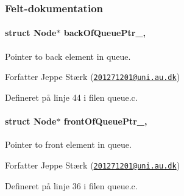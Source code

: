 \subsubsection{Felt-\/dokumentation}
\paragraph[{\texorpdfstring{back\+Of\+Queue\+Ptr\+\_\+}{backOfQueuePtr_}}]{\setlength{\rightskip}{0pt plus 5cm}struct {\bf Node}$\ast$ back\+Of\+Queue\+Ptr\+\_\+\hspace{0.3cm}{\ttfamily [static]}, {\ttfamily [private]}}\hypertarget{class_queue_a225d2c9ad4e83d6da443e99b8869a51c}{}\label{class_queue_a225d2c9ad4e83d6da443e99b8869a51c}


Pointer to back element in queue. 

\begin{DoxyAuthor}{Forfatter}
Jeppe Stærk (\href{mailto:201271201@uni.au.dk}{\tt 201271201@uni.\+au.\+dk}) 
\end{DoxyAuthor}


Defineret på linje 44 i filen queue.\+c.

\paragraph[{\texorpdfstring{front\+Of\+Queue\+Ptr\+\_\+}{frontOfQueuePtr_}}]{\setlength{\rightskip}{0pt plus 5cm}struct {\bf Node}$\ast$ front\+Of\+Queue\+Ptr\+\_\+\hspace{0.3cm}{\ttfamily [static]}, {\ttfamily [private]}}\hypertarget{class_queue_aa48f05218d0a78402821c8aa9bdad06a}{}\label{class_queue_aa48f05218d0a78402821c8aa9bdad06a}


Pointer to front element in queue. 

\begin{DoxyAuthor}{Forfatter}
Jeppe Stærk (\href{mailto:201271201@uni.au.dk}{\tt 201271201@uni.\+au.\+dk}) 
\end{DoxyAuthor}


Defineret på linje 36 i filen queue.\+c.

